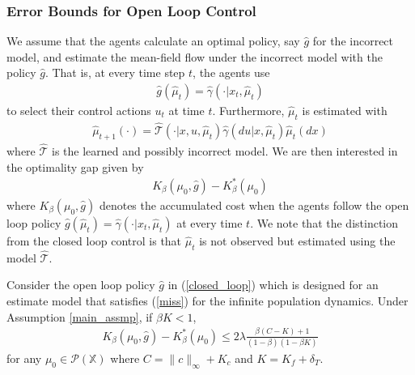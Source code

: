 \documentclass[twoside,11pt]{article}
\def\P{{\mathcal P}}
\begin{document}
\subsubsection{Error Bounds for Open Loop Control}  
We assume that the agents calculate an optimal policy, say $\hat{g}$ for the incorrect model, and estimate the mean-field flow under the incorrect model with the policy $\hat{g}$. That is, at every time step $t$, the agents use
\begin{align}\label{open_loop}
\hat{g}(\hat{\mu}_t) = \hat{\gamma}(\cdot|x_t,\hat{\mu}_t)
\end{align}
to select their control actions $u_t$ at time $t$. Furthermore, $\hat{\mu}_t$ is estimated with 
\begin{align}\label{open_loop_mu}
\hat{\mu}_{t+1}(\cdot)=\hat{\mathcal{T}}(\cdot|x,u,\hat{\mu}_t)\hat{\gamma}(du|x,\hat{\mu}_t)\hat{\mu}_t(dx)
\end{align}
where $\hat{\mathcal{T}}$ is the learned and possibly incorrect model.
We are then interested in the optimality gap given by
\begin{align*}
K_\beta(\mu_0,\hat{g}) - K_\beta^*(\mu_0)
\end{align*}
where $K_\beta(\mu_0,\hat{g})$ denotes the accumulated cost when the agents follow the open loop policy $\hat{g}(\hat{\mu}_t) = \hat{\gamma}(\cdot|x_t,\hat{\mu}_t)$ at every time $t$. We note that the distinction from the closed loop control is that $\hat{\mu}_t$ is not observed but estimated using the model $\hat{\mathcal{T}}$.

\begin{theorem}
Consider the open loop policy $\hat{g}$ in (\ref{closed_loop}) which is designed for an estimate model that satisfies (\ref{miss}) for the infinite population dynamics. Under Assumption \ref{main_assmp}, if $\beta K<1$,
\begin{align*}
K_\beta(\mu_0,\hat{g}) - K_\beta^*(\mu_0) \leq  2\lambda\frac{\beta (C-K) +1}{(1-\beta)(1-\beta K)}
\end{align*}
for any $\mu_0\in\P(\mathds{X})$ where $C=\|c\|_\infty +  K_c$ and $K=K_f + \delta_T$.
\end{theorem}
\end{document}
